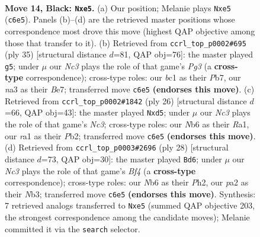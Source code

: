 \documentclass[11pt]{article}
\begin{document}
\clearpage

\begin{figure}[p]\centering
\begin{subfigure}{0.46\textwidth}\centering
\resizebox{\linewidth}{!}{%
\newchessgame
\chessboard[
  setfen={2kr2r1/ppp1ppbp/1nn3p1/4P3/7P/NB3P2/PPP2P2/R1B1K1R1 b - - 0 14},
  showmover=false,
  pgfstyle=straightmove, color=movearrow, markmove={c6-e5}
]}
\caption{}
\end{subfigure}\hfill
\begin{subfigure}{0.46\textwidth}\centering
\resizebox{\linewidth}{!}{%
\newchessgame
\chessboard[
  setfen={3rk2r/pp2bpp1/2n1n1p1/3pP3/8/5NB1/PPP3PP/2KR1B1R b k - 3 18},
  showmover=false,
  pgfstyle=straightmove, color=movearrow, markmove={g6-g5}
]}
\caption{}
\end{subfigure}
\\[4pt]
\begin{subfigure}{0.46\textwidth}\centering
\resizebox{\linewidth}{!}{%
\newchessgame
\chessboard[
  setfen={r1b2rk1/ppp3pp/2nb2p1/3p2B1/3P4/2N2N2/PPP2PPP/R3R1K1 w - - 0 14},
  showmover=false,
  pgfstyle=straightmove, color=movearrow, markmove={c3-d5}
]}
\caption{}
\end{subfigure}\hfill
\begin{subfigure}{0.46\textwidth}\centering
\resizebox{\linewidth}{!}{%
\newchessgame
\chessboard[
  setfen={rnb1r1k1/pp3p2/1bp2n1p/6p1/5B2/1NN3P1/PP2PPBP/R2R2K1 w - - 2 15},
  showmover=false,
  pgfstyle=straightmove, color=movearrow, markmove={f4-d6}
]}
\caption{}
\end{subfigure}
\caption{\textbf{Move 14, Black: \texttt{Nxe5}.} (a) Our position; Melanie plays \texttt{Nxe5} (\texttt{c6e5}). Panels (b)--(d) are the retrieved master positions whose correspondence most drove this move (highest QAP objective among those that transfer to it). (b) Retrieved from \texttt{ccrl\_top\_p0002\#695} (ply 35) [structural distance $d$=81, QAP obj=76]: the master played \texttt{g5}; under $\mu$ our \emph{Nc3} plays the role of that game's \emph{Pg3} (a \textbf{cross-type} correspondence); cross-type roles: our \emph{b}c1 as their \emph{P}b7, our \emph{n}a3 as their \emph{B}e7; transferred move \texttt{c6e5} \textbf{(endorses this move)}. (c) Retrieved from \texttt{ccrl\_top\_p0002\#1842} (ply 26) [structural distance $d$=66, QAP obj=43]: the master played \texttt{Nxd5}; under $\mu$ our \emph{Nc3} plays the role of that game's \emph{Nc3}; cross-type roles: our \emph{N}b6 as their \emph{R}a1, our \emph{r}a1 as their \emph{P}b2; transferred move \texttt{c6e5} \textbf{(endorses this move)}. (d) Retrieved from \texttt{ccrl\_top\_p0003\#2696} (ply 28) [structural distance $d$=73, QAP obj=30]: the master played \texttt{Bd6}; under $\mu$ our \emph{Nc3} plays the role of that game's \emph{Bf4} (a \textbf{cross-type} correspondence); cross-type roles: our \emph{N}b6 as their \emph{P}h2, our \emph{p}a2 as their \emph{N}b3; transferred move \texttt{c6e5} \textbf{(endorses this move)}. Synthesis: 7 retrieved analogs transferred to \texttt{Nxe5} (summed QAP objective 203, the strongest correspondence among the candidate moves); Melanie committed it via the \texttt{search} selector.}
\label{fig:thought-m27}
\end{figure}
\end{document}
